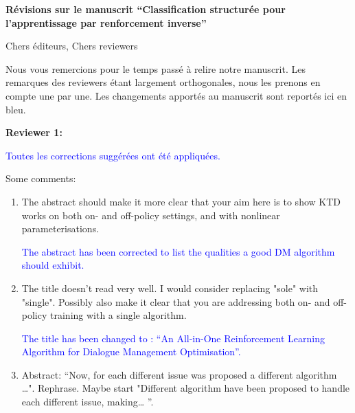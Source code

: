 \documentclass[11pt, a4paper]{letter}
\begin{document}

\color{blue}

\address{Edouard Klein,  Matthieu Geist, \\Bilal Piot, Olivier Pietquin \\ IMS – MaLIS Research Group, Sup\'elec \\ 2 rue Edouard Belin, 57070 Metz (France)}
\date{Metz, \today. \vspace{1.5cm}}



\begin{letter}{\large \textbf{Révisions sur le manuscrit ``Classification structurée pour l'apprentissage par renforcement inverse''}}
\bigskip
\opening{Chers éditeurs, Chers reviewers}

\bigskip

Nous vous remercions pour le temps passé à relire notre manuscrit. Les remarques des reviewers étant largement orthogonales, nous les prenons en compte une par une. Les changements apportés au manuscrit sont reportés ici en bleu.

\newpage
\color{black}
\begin{large} \textbf{Reviewer 1:} \\ \end{large}
\textcolor{blue}{
Toutes les corrections suggérées ont été appliquées.
}

Some comments:
\begin{enumerate}
\item The abstract should make it more clear that your aim here is to show KTD works on both on- and off-policy settings, and with nonlinear parameterisations.

\textcolor{blue}{ The abstract has been corrected to list the qualities a good DM algorithm should exhibit.}

\item The title doesn't read very well. I would consider replacing "sole" with "single". Possibly also make it clear that you are addressing both on- and off-policy training with a single algorithm.

\textcolor{blue}{ The title has been changed to : ``An All-in-One
Reinforcement Learning Algorithm for Dialogue Management
Optimisation''.}

\item Abstract: ``Now, for each different issue was proposed a different algorithm  …". Rephrase. Maybe start "Different algorithm have been proposed to handle each different issue, making… ''.


\end{enumerate}
\end{letter}
\end{document}
